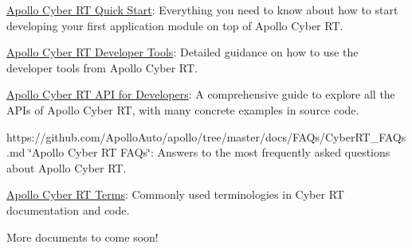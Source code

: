 
\begin{DoxyItemize}
\item \hyperlink{CyberRT__Quick__Start_8md}{Apollo Cyber R\-T Quick Start}\-: Everything you need to know about how to start developing your first application module on top of Apollo Cyber R\-T.
\item \hyperlink{CyberRT__Developer__Tools_8md}{Apollo Cyber R\-T Developer Tools}\-: Detailed guidance on how to use the developer tools from Apollo Cyber R\-T.
\item \hyperlink{CyberRT__API__for__Developers_8md}{Apollo Cyber R\-T A\-P\-I for Developers}\-: A comprehensive guide to explore all the A\-P\-Is of Apollo Cyber R\-T, with many concrete examples in source code.
\item https\-://github.com/\-Apollo\-Auto/apollo/tree/master/docs/\-F\-A\-Qs/\-Cyber\-R\-T\-\_\-\-F\-A\-Qs.\-md \char`\"{}\-Apollo Cyber R\-T F\-A\-Qs\char`\"{}\-: Answers to the most frequently asked questions about Apollo Cyber R\-T.
\item \hyperlink{CyberRT__Terms_8md}{Apollo Cyber R\-T Terms}\-: Commonly used terminologies in Cyber R\-T documentation and code.
\end{DoxyItemize}

More documents to come soon! 